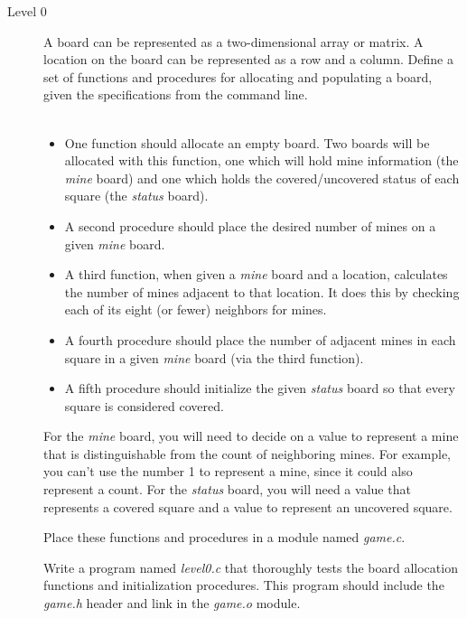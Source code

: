 \documentclass{article}
\begin{document}
\begin{description}
\item[Level 0]
    A board can be represented as a two-dimensional array or matrix. A
    location on the board can be represented as a row and a column.
    Define a set of functions and procedures
    for allocating and populating a board,
    given the specifications from the command line.\W\\
    \W~

    \begin{itemize}
        \item One function should allocate an empty board. Two boards will be
            allocated with this function, one which will hold mine information
            (the {\it mine} board) and one which holds the covered/uncovered
            status of each square (the {\it status} board).
        \item A second procedure should place the desired number of mines on
            a given {\it mine} board.
        \item A third function, when given a {\it mine} board and a location,
            calculates the number of mines adjacent to that location.
            It does this by checking each of its eight (or fewer) neighbors
            for mines.
        \item A fourth procedure should place the number of adjacent mines in
            each square in a given {\it mine} board (via the third function).
        \item A fifth procedure should initialize the given {\it status}
            board so that every square is considered covered.
    \end{itemize}

    For the {\it mine} board, you will need to decide on a value to
    represent a mine that is distinguishable from the count of neighboring
    mines. For example, you can't use the number 1 to represent a mine,
    since it could also represent a count. For the {\it status} board,
    you will need a value that represents a covered square and a value
    to represent an uncovered square.

    Place these functions and procedures in a module named {\it game.c}.

    Write a program named {\it level0.c} that thoroughly tests the
    board allocation functions and initialization procedures.
    This program should include the {\it game.h} header and link in
    the {\it game.o} module.


\end{description}
\end{document}
